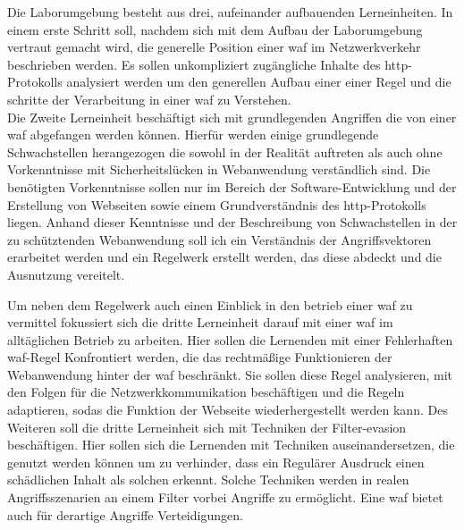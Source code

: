 Die Laborumgebung besteht aus drei, aufeinander aufbauenden Lerneinheiten.
In einem erste Schritt soll, nachdem sich mit dem Aufbau der Laborumgebung vertraut gemacht wird, die generelle Position einer \ac{waf} im Netzwerkverkehr beschrieben werden.
Es sollen unkompliziert zugängliche Inhalte des \ac{http}-Protokolls analysiert werden um den generellen Aufbau einer einer Regel und die schritte der Verarbeitung in einer \ac{waf} zu Verstehen.\\

Die Zweite Lerneinheit beschäftigt sich mit grundlegenden Angriffen die von einer \ac{waf} abgefangen werden können.
Hierfür werden einige grundlegende Schwachstellen herangezogen die sowohl in der Realität auftreten als auch ohne Vorkenntnisse mit Sicherheitslücken in Webanwendung verständlich sind.
Die benötigten Vorkenntnisse sollen nur im Bereich der Software-Entwicklung und der Erstellung von Webseiten sowie einem Grundverständnis des \ac{http}-Protokolls liegen.
Anhand dieser Kenntnisse und der Beschreibung von Schwachstellen in der zu schütztenden Webanwendung soll ich ein Verständnis der Angriffsvektoren erarbeitet werden und ein Regelwerk erstellt werden, das diese abdeckt und die Ausnutzung vereitelt.

Um neben dem Regelwerk auch einen Einblick in den betrieb einer \ac{waf} zu vermittel fokussiert sich die dritte Lerneinheit darauf mit einer \ac{waf} im alltäglichen Betrieb zu arbeiten.
Hier sollen die Lernenden mit einer Fehlerhaften \ac{waf}-Regel Konfrontiert werden, die das rechtmäßige Funktionieren der Webanwendung  hinter der \ac{waf} beschränkt.
Sie sollen diese Regel analysieren, mit den Folgen für die Netzwerkkommunikation beschäftigen und die Regeln adaptieren, sodas die Funktion der Webseite wiederhergestellt werden kann.
Des Weiteren soll die dritte Lerneinheit sich mit Techniken der Filter-evasion beschäftigen.
Hier sollen sich die Lernenden mit Techniken auseinandersetzen, die genutzt werden können um zu verhinder, dass ein Regulärer Ausdruck einen schädlichen Inhalt als solchen erkennt.
Solche Techniken werden in realen Angriffsszenarien an einem Filter vorbei Angriffe zu ermöglicht.
Eine \ac{waf} bietet auch für derartige Angriffe Verteidigungen.